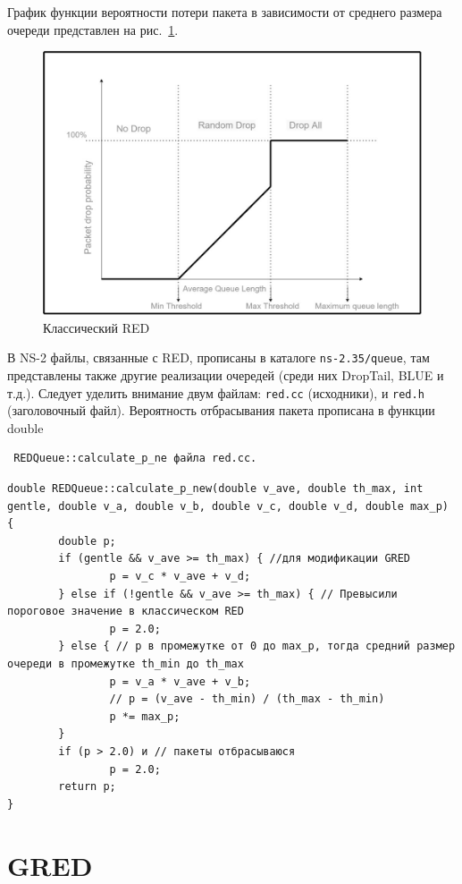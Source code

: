 График функции вероятности потери пакета в зависимости от среднего
размера очереди представлен на рис.~\ref{fig:2.1}.

\begin{figure}[!h]
  \centering
  \includegraphics[width=0.7\linewidth]{image/RED.png}
  \caption{Классический RED}
  \label{fig:2.1}
\end{figure}


В NS-2 файлы, связанные с RED, прописаны в каталоге
\verb|ns-2.35/queue|, там представлены также другие реализации
очередей (среди них DropTail, BLUE и т.д.). Следует уделить внимание
двум файлам: \verb|red.cc| (исходники), и \verb|red.h| (заголовочный
файл). Вероятность отбрасывания пакета прописана в функции
double \begin{verbatim} REDQueue::calculate_p_ne файла red.cc. \end{verbatim}

\begin{verbatim}
double REDQueue::calculate_p_new(double v_ave, double th_max, int gentle, double v_a, double v_b, double v_c, double v_d, double max_p)
{
        double p;
        if (gentle && v_ave >= th_max) { //для модификации GRED
                p = v_c * v_ave + v_d;
        } else if (!gentle && v_ave >= th_max) { // Превысили пороговое значение в классическом RED
                p = 2.0;
        } else { // p в промежутке от 0 до max_p, тогда средний размер очереди в промежутке th_min до th_max
                p = v_a * v_ave + v_b;
                // p = (v_ave - th_min) / (th_max - th_min)
                p *= max_p; 
        }
        if (p > 2.0) и // пакеты отбрасываюся
                p = 2.0;
        return p;
}
\end{verbatim}

\section{GRED} 

